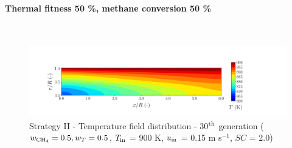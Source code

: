 \documentclass[preprint,12pt]{elsarticle}
\begin{document}


\clearpage





\paragraph{Thermal fitness 50 \%, methane conversion 50 \%} \hspace{0pt} \\
\noindent 

%

\begin{figure}[h!]
\centering
\includegraphics[width=190mm]{results/5Eq/50C_50T/GEN30-TFIELD.png}
\caption{\label{fig:5RES5050G30-TField} Strategy II - Temperature field distribution - 30$^{\rm{th}}$ generation ($w_{\rm{CH_4}} = 0.5, w_T = 0.5$, $T_{\rm{in}}$ = 900 K, $u_{\rm{in}}$ = 0.15 m s$^{-1}$, $SC$ = 2.0)}
\end{figure}
\end{document}
